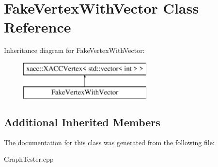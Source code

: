 \hypertarget{a01228}{}\section{Fake\+Vertex\+With\+Vector Class Reference}
\label{a01228}
Inheritance diagram for Fake\+Vertex\+With\+Vector\+:\begin{figure}[H]
\begin{center}
\leavevmode
\includegraphics[height=2.000000cm]{a01228}
\end{center}
\end{figure}
\subsection*{Additional Inherited Members}


The documentation for this class was generated from the following file\+:\begin{DoxyCompactItemize}
\item 
Graph\+Tester.\+cpp\end{DoxyCompactItemize}
